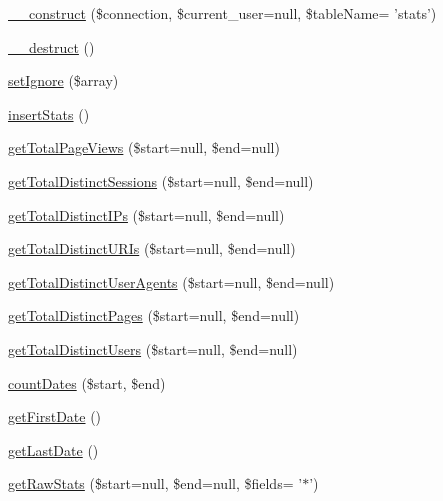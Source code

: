 \begin{DoxyCompactItemize}
\item 
\hyperlink{class_stats_a9b576568bc17458490e6985a7489c3a9}{\-\_\-\-\_\-construct} (\$connection, \$current\-\_\-user=null, \$table\-Name= 'stats')
\item 
\hyperlink{class_stats_a421831a265621325e1fdd19aace0c758}{\-\_\-\-\_\-destruct} ()
\item 
\hyperlink{class_stats_a604a265217a1774947350bca38b39e01}{set\-Ignore} (\$array)
\item 
\hyperlink{class_stats_aec6efc1f87114d251b6d91be90bc3ddd}{insert\-Stats} ()
\item 
\hyperlink{class_stats_a017d22295900a75171f1a3e5b488eb09}{get\-Total\-Page\-Views} (\$start=null, \$end=null)
\item 
\hyperlink{class_stats_aa186bab67dcb150d445b84e6ec52cfd9}{get\-Total\-Distinct\-Sessions} (\$start=null, \$end=null)
\item 
\hyperlink{class_stats_ab8b13de24fa5d9e50a0d7cf9e9f1af32}{get\-Total\-Distinct\-I\-Ps} (\$start=null, \$end=null)
\item 
\hyperlink{class_stats_a0c99010e511c7fc19ad59f16179524cb}{get\-Total\-Distinct\-U\-R\-Is} (\$start=null, \$end=null)
\item 
\hyperlink{class_stats_a85991d88c2f5401b051cc554b04bdec8}{get\-Total\-Distinct\-User\-Agents} (\$start=null, \$end=null)
\item 
\hyperlink{class_stats_aaf9ae81485efae3ce6f902ddac969a45}{get\-Total\-Distinct\-Pages} (\$start=null, \$end=null)
\item 
\hyperlink{class_stats_a6c944fec89049927b811bd786a934e96}{get\-Total\-Distinct\-Users} (\$start=null, \$end=null)
\item 
\hyperlink{class_stats_adf94df76cef17a9a175924473b71446e}{count\-Dates} (\$start, \$end)
\item 
\hyperlink{class_stats_a025ccf47b1021dba92cb33c15b36e63b}{get\-First\-Date} ()
\item 
\hyperlink{class_stats_a4de981ae1f7c64de95d1d98f001b3e5f}{get\-Last\-Date} ()
\item 
\hyperlink{class_stats_af0592a90f0b14c809dad12c026a18b68}{get\-Raw\-Stats} (\$start=null, \$end=null, \$fields= '$\ast$')
\end{DoxyCompactItemize}
